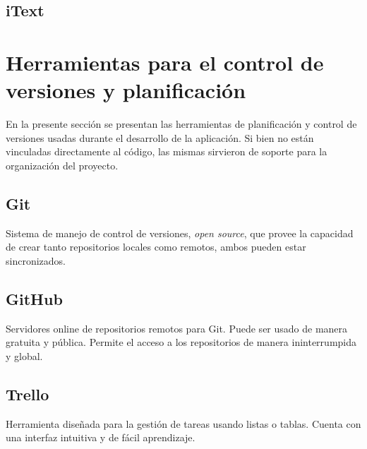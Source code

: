         \subsection{iText}
        
    \section{Herramientas para el control de versiones y planificación}
    
    En la presente sección se presentan las herramientas de planificación y control de versiones usadas durante el desarrollo de la aplicación. Si bien no están vinculadas directamente al código, las mismas sirvieron de soporte para la organización del proyecto.
    
        \subsection{Git}
        
        Sistema de manejo de control de versiones, \textit{open source}, que provee la capacidad de crear tanto repositorios locales como remotos, ambos pueden estar sincronizados.
        
        \subsection{GitHub}
        
        Servidores online de repositorios remotos para Git. Puede ser usado de manera gratuita y pública. Permite el acceso a los repositorios de manera ininterrumpida y global.
        
        \subsection{Trello}
        
        Herramienta diseñada para la gestión de tareas usando listas o tablas. Cuenta con una interfaz intuitiva y de fácil aprendizaje.
        
        
        
    
\pagebreak
